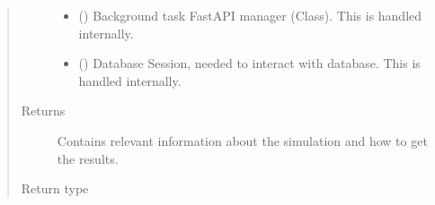 \documentclass[a4paper,landscape,10pt,english]{sphinxmanual}
\begin{document}
\begin{fulllineitems}
\begin{quote}
\begin{description}
\begin{itemize}
\item {} 
 () \textendash{} Background task FastAPI manager (Class). This is handled internally.

\item {} 
 () \textendash{} Database Session, needed to interact with database. This is handled
internally.

\end{itemize}

\item[{Returns}] \leavevmode
{} \textendash{} Contains relevant information about the simulation and how to get the
results.

\item[{Return type}] \leavevmode
{\hyperref[\detokenize{code_docs/simulation_API.controller:simulation_API.controller.schemas.SimIdResponse}]{}}

\end{description}\end{quote}

\end{fulllineitems}

\end{document}

